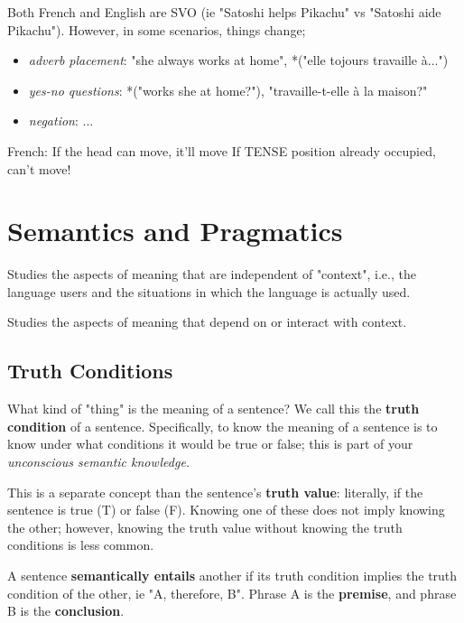 \documentclass[12pt]{article}
\begin{document}
Both French and English are SVO (ie "Satoshi helps Pikachu" vs "Satoshi aide Pikachu"). However, in some scenarios, things change; 
\begin{itemize}
  \item \textit{adverb placement}: "she always works at home", *("elle tojours travaille à...")
  \item \textit{yes-no questions}: *("works she at home?"), "travaille-t-elle à la maison?"
  \item \textit{negation}: ...
\end{itemize}

French: If the head can move, it'll move
If TENSE position already occupied, can't move!


\section{Semantics and Pragmatics}

\begin{definitionEnd}[Semantics]
  Studies the aspects of meaning that are independent of "context", i.e., the language users and the situations in which the language is actually used.
\end{definitionEnd}

\begin{definitionEnd}[Pragmatics]
  Studies the aspects of meaning that depend on or interact with context.
\end{definitionEnd}

\subsection{Truth Conditions}

What kind of "thing" is the meaning of a sentence? We call this the \textbf{truth condition} of a sentence. Specifically, to know the meaning of a sentence is to know under what conditions it would be true or false; this is part of your \textit{unconscious semantic knowledge.}

This is a separate concept than the sentence's \textbf{truth value}: literally, if the sentence is true (T) or false (F). Knowing one of these does not imply knowing the other; however, knowing the truth value without knowing the truth conditions is less common.

\begin{definitionEnd}
  A sentence \textbf{semantically entails} another if its truth condition implies the truth condition of the other, ie "A, therefore, B". Phrase A is the \textbf{premise}, and phrase B is the \textbf{conclusion}.
\end{definitionEnd}
\end{document}
